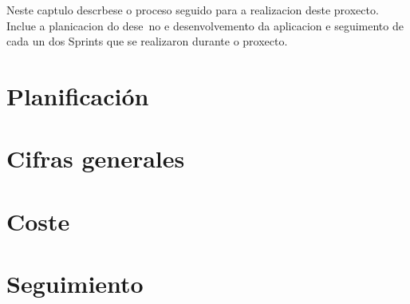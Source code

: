 
Neste captulo descrbese o proceso seguido para a realizacion deste proxecto. Inclue
a planicacion do dese~no e desenvolvemento da aplicacion e seguimento de cada un dos
Sprints que se realizaron durante o proxecto.
\section{Planificación}

\section{Cifras generales}


\section{Coste}

\section{Seguimiento}